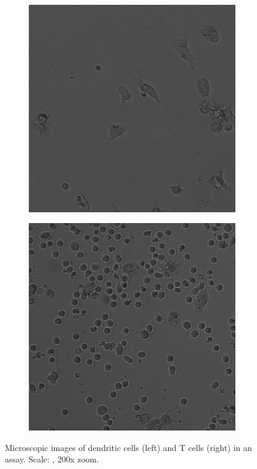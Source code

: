 \begin{figure}[h]
    \centering
    \begin{subfigure}[h!]{0.3\textwidth}
        \includegraphics[width=\textwidth]{dissertation/figures/example_DCs.png}
    \end{subfigure}
    \begin{subfigure}[h!]{0.3\textwidth}
        \includegraphics[width=\textwidth]{dissertation/figures/example_Tcells.png}
    \end{subfigure}
    \caption{Microscopic images of dendritic cells (left) and T cells (right) in an assay. Scale: , 200x zoom.}
\end{figure}

